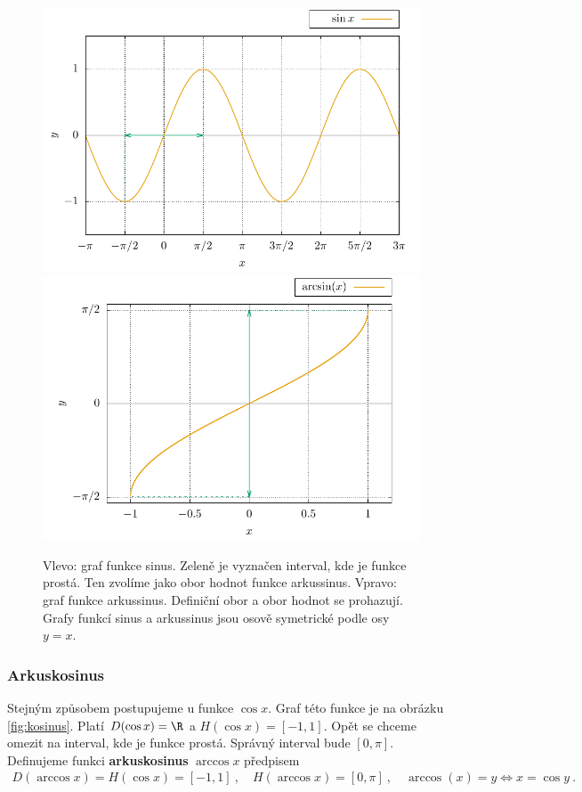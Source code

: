 \begin{figure}[H]
    \centering
    \includegraphics[scale = 0.7]{Gnuplot/cv1/Figures/sinusgraf.pdf}
    \includegraphics[scale = 0.7]{Gnuplot/cv1/Figures/arcsin.pdf}
    \caption{Vlevo: graf funkce sinus. Zeleně je vyznačen interval, kde je funkce prostá. Ten zvolíme jako obor hodnot funkce arkussinus. Vpravo: graf funkce arkussinus. Definiční obor a obor hodnot se prohazují. Grafy funkcí sinus a arkussinus jsou osově symetrické podle osy $y=x$.}
    \label{fig:sinus}
\end{figure}


\subsubsection*{Arkuskosinus}

Stejným způsobem postupujeme u funkce $\cos x$. Graf této funkce je na obrázku \ref{fig:kosinus}. Platí $D(\cos x) = \R$ a $H(\cos x) = [-1,1]$. Opět se chceme omezit na interval, kde je funkce prostá. Správný interval bude $[0,\pi]$. Definujeme funkci \textbf{arkuskosinus} $\arccos x$ předpisem \begin{align}
    D(\arccos x) = H(\cos x) = [-1,1] \:, \quad H(\arccos x) = [0, \pi] \:, \quad \arccos(x) = y \Longleftrightarrow x = \cos y \:.
\end{align}

